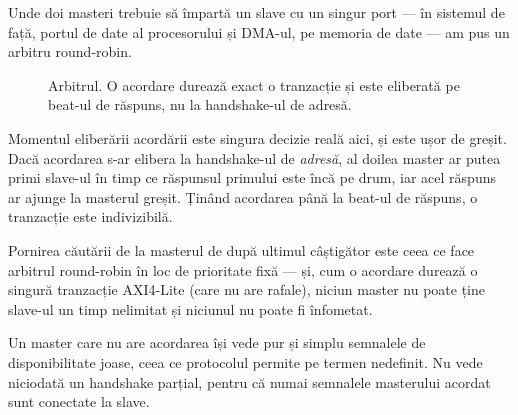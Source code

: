 \documentclass[11pt,openany]{report}
\begin{document}
Unde doi masteri trebuie să împartă un slave cu un singur port --- în sistemul
de față, portul de date al procesorului și DMA-ul, pe memoria de date --- am
pus un arbitru round-robin.

\begin{figure}[H]
\centering
{}
\caption{Arbitrul. O acordare durează exact o tranzacție și este eliberată pe
beat-ul de răspuns, nu la handshake-ul de adresă.}
\label{fig:arbfsm}
\end{figure}

Momentul eliberării acordării este singura decizie reală aici, și este ușor de
greșit. Dacă acordarea s-ar elibera la handshake-ul de \emph{adresă}, al doilea
master ar putea primi slave-ul în timp ce răspunsul primului este încă pe drum,
iar acel răspuns ar ajunge la masterul greșit. Ținând acordarea până la beat-ul
de răspuns, o tranzacție este indivizibilă.

Pornirea căutării de la masterul de după ultimul câștigător este ceea ce face
arbitrul round-robin în loc de prioritate fixă --- și, cum o acordare durează o
singură tranzacție AXI4-Lite (care nu are rafale), niciun master nu poate ține
slave-ul un timp nelimitat și niciunul nu poate fi înfometat.

Un master care nu are acordarea își vede pur și simplu semnalele de
disponibilitate joase, ceea ce protocolul permite pe termen nedefinit. Nu vede
niciodată un handshake parțial, pentru că numai semnalele masterului acordat
sunt conectate la slave.
\end{document}
